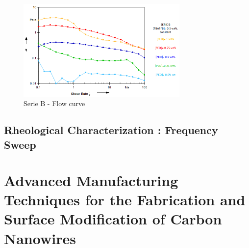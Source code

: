 \begin{figure}[th]
\centering
\includegraphics[width=0.75\textwidth]{./Figures/SerieBflowCurve.png}
\decoRule
\caption[Serie B - Flow curve]{Serie B - Flow curve}
\label{fig:SerieBflowCurve}
\end{figure}


\subsection{Rheological Characterization : \textbf{Frequency Sweep}}



\clearpage

\section{Advanced Manufacturing Techniques for the Fabrication and Surface Modification of Carbon Nanowires \cite{Cardenas2017}}




